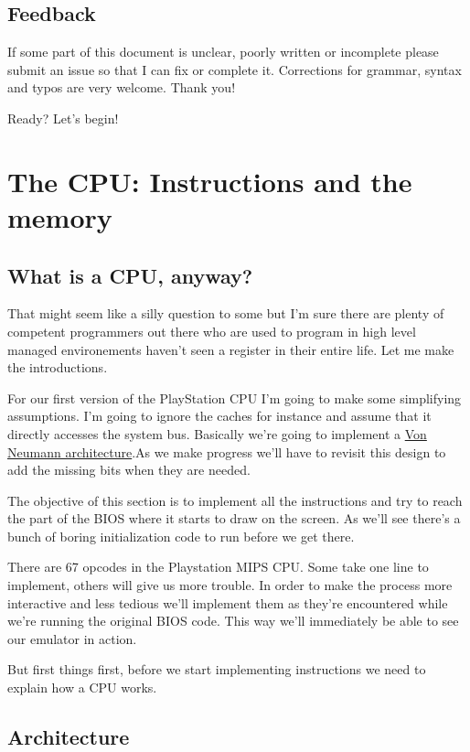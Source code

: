 \documentclass[a4paper]{article}
\begin{document}
\subsection{Feedback}

If some part of this document is unclear, poorly written or incomplete
please submit an issue so that I can fix or complete it. Corrections
for grammar, syntax and typos are very welcome. Thank you!

Ready? Let's begin!

\section{The CPU: Instructions and the memory}

\subsection{What is a CPU, anyway?}

That might seem like a silly question to some but I'm sure there are
plenty of competent programmers out there who are used to program in
high level managed environements haven't seen a register in their
entire life. Let me make the introductions.

For our first version of the PlayStation CPU I'm going to make some
simplifying assumptions. I'm going to ignore the caches for instance
and assume that it directly accesses the system bus. Basically we're
going to implement a
\href{https://en.wikipedia.org/wiki/Von_Neumann_architecture}{Von
 Neumann architecture}.As we make progress we'll have to revisit this
design to add the missing bits when they are needed.

The objective of this section is to implement all the instructions and
try to reach the part of the BIOS where it starts to draw on the
screen. As we'll see there's a bunch of boring initialization code to
run before we get there.

There are 67 opcodes in the Playstation MIPS CPU. Some take one line
to implement, others will give us more trouble. In order to make the
process more interactive and less tedious we'll implement them as
they're encountered while we're running the original BIOS code. This
way we'll immediately be able to see our emulator in action.

But first things first, before we start implementing instructions we
need to explain how a CPU works.

\subsection{Architecture}
\end{document}

